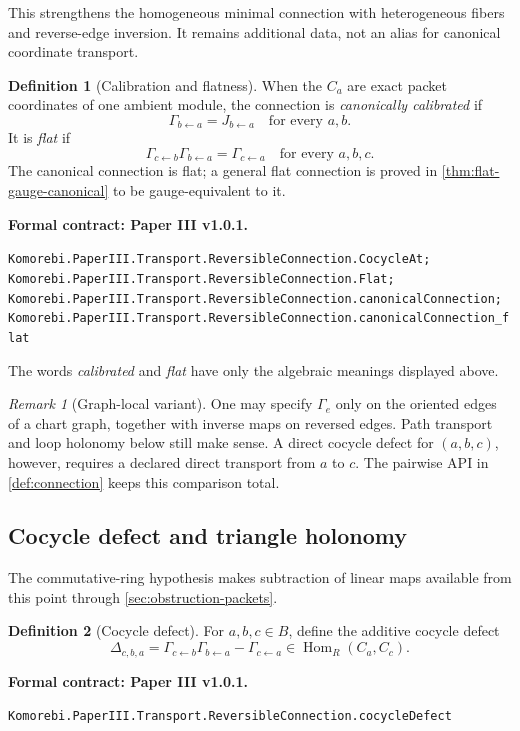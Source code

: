 \documentclass[11pt,a4paper]{article}
\theoremstyle{plain}
\theoremstyle{definition}
\newtheorem{definition}[definition]{Definition}
\theoremstyle{remark}
\newtheorem{remark}[remark]{Remark}
\newcommand{\Hom}{\operatorname{Hom}}
\newcommand{\leanname}[1]{\nolinkurl{#1}}
\newcommand{\statusleanthree}[1]{\par\smallskip\noindent\begin{minipage}{\linewidth}{\color{leanblue}\textbf{Formal contract: Paper III v1.0.1.}}\par\begingroup\small\raggedright\leanname{#1}\par\endgroup\end{minipage}\par\smallskip}
\begin{document}
This strengthens the homogeneous minimal connection with heterogeneous
fibers and reverse-edge inversion.  It remains additional data, not an alias
for canonical coordinate transport.

\begin{definition}[Calibration and flatness]
\label{def:calibration-flatness}
When the $C_a$ are exact packet coordinates of one ambient module, the
connection is \emph{canonically calibrated} if
\[
\Gamma_{b\leftarrow a}=J_{b\leftarrow a}
\quad\text{for every }a,b.
\]
It is \emph{flat} if
\[
\Gamma_{c\leftarrow b}\Gamma_{b\leftarrow a}
=
\Gamma_{c\leftarrow a}
\quad\text{for every }a,b,c.
\]
The canonical connection is flat; a general flat connection is proved in
\cref{thm:flat-gauge-canonical} to be gauge-equivalent to it.
\end{definition}
\statusleanthree{Komorebi.PaperIII.Transport.ReversibleConnection.CocycleAt; Komorebi.PaperIII.Transport.ReversibleConnection.Flat; Komorebi.PaperIII.Transport.ReversibleConnection.canonicalConnection; Komorebi.PaperIII.Transport.ReversibleConnection.canonicalConnection_flat}

The words \emph{calibrated} and \emph{flat} have only the algebraic meanings
displayed above.

\begin{remark}[Graph-local variant]
One may specify $\Gamma_e$ only on the oriented edges of a chart graph,
together with inverse maps on reversed edges.  Path transport and loop
holonomy below still make sense.  A direct cocycle defect for $(a,b,c)$,
however, requires a declared direct transport from $a$ to $c$.  The pairwise
API in \cref{def:connection} keeps this comparison total.
\end{remark}

\subsection{Cocycle defect and triangle holonomy}

The commutative-ring hypothesis makes subtraction of linear maps available
from this point through \cref{sec:obstruction-packets}.

\begin{definition}[Cocycle defect]
\label{def:cocycle-defect}
For $a,b,c\in B$, define the additive cocycle defect
\[
\Delta_{c,b,a}
=
\Gamma_{c\leftarrow b}\Gamma_{b\leftarrow a}
-\Gamma_{c\leftarrow a}
\in\Hom_R(C_a,C_c).
\]
\end{definition}
\statusleanthree{Komorebi.PaperIII.Transport.ReversibleConnection.cocycleDefect}
\end{document}
